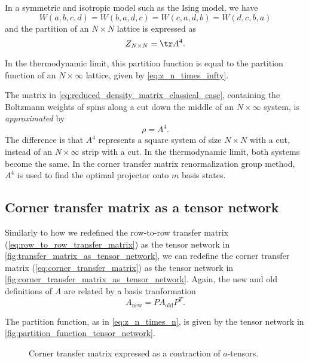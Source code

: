 In a symmetric and isotropic model such as the Ising model, we have
\begin{equation}
  W(a, b, c, d) = W(b, a, d, c) = W(c, a, d, b) = W(d, c, b, a)
\end{equation}
and the partition of an $N \times N$ lattice is expressed as
\begin{equation}\label{eq:z_n_times_n}
  Z_{N \times N} = \tr A^4.
\end{equation}

In the thermodynamic limit, this partition function is equal to
the partition function of an $N \times \infty$ lattice, given by
\autoref{eq:z_n_times_infty}.

The matrix in \autoref{eq:reduced_density_matrix_classical_case}, containing the Boltzmann
weights of spins along a cut down the middle of an $N \times \infty$ system, is
\textit{approximated} by
\begin{equation}
  \rho = A^4.
\end{equation}
The difference is that $A^4$ represents a square system of size $N \times N$ with a
cut, instead of an $N \times \infty$ strip with a cut. In the thermodynamic limit, both
systems become the same. In the corner transfer matrix renormalization group method, $A^4$
is used to find the optimal projector onto $m$ basis states.

\subsection{Corner transfer matrix as a tensor network}
Similarly to how we redefined the row-to-row transfer matrix
(\autoref{eq:row_to_row_transfer_matrix}) as the tensor network in
\autoref{fig:transfer_matrix_as_tensor_network}, we can redefine the corner transfer
matrix (\autoref{eq:corner_transfer_matrix}) as the tensor network in
\autoref{fig:corner_transfer_matrix_as_tensor_network}. Again, the new and old definitions
of $A$ are related by a basis tranformation
\begin{equation}
  A_{\text{new}} = P A_{\text{old}} P^T.
\end{equation}

The partition function, as in \autoref{eq:z_n_times_n}, is given by the tensor network in
\autoref{fig:partition_function_tensor_network}.

\begin{figure}
  
  \caption{Corner transfer matrix expressed as a contraction of $a$-tensors.}
  \label{fig:corner_transfer_matrix_as_tensor_network}
\end{figure}

